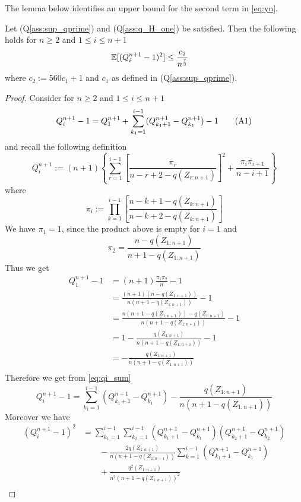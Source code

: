 %
The lemma below identifies an upper bound for the second term in \eqref{eq:yn}.
\begin{lemma} \label{lem:qisquare_upper_bound} 
	Let (Q\ref{ass:sup_qprime})  and (Q\ref{ass:q_H_one}) be satisfied. Then the following holds for $n\geq 2$ and $1\leq i\leq n+1$ 
	\begin{align*}
		\mathbb{E}[(Q_i^{n+1} - 1)^2] &\leq \frac{c_2}{n^\frac{7}{3}}
	\end{align*}
	where $c_2:= 560 c_1 + 1$ and $c_1$ as defined in (Q\ref{ass:sup_qprime}). 
	\begin{proof}
		Consider for $n\geq 2$ and $1\leq i\leq n+1$
		\begin{equation*}
			Q_i^{n+1} - 1 = Q_1^{n+1} + \sum_{k_1=1}^{i-1} (Q_{k_1+1}^{n+1} - Q_{k_1}^{n+1}) - 1 \numberthis \label{eq:qi_sum}
		\end{equation*}
		and recall the following definition
		$$Q_i^{n+1} := (n+1)\left\{\sum_{r=1}^{i-1}\left[\frac{\pi_r}{n-r+2-q(Z_{r:n+1})}\right]^2 + \frac{\pi_i \pi_{i+1}}{n-i+1} \right\}$$
		where
		$$\pi_i := \prod_{k=1}^{i-1} \left[\frac{n-k+1-q(Z_{k:n+1})}{n-k+2-q(Z_{k:n+1})}\right]$$
		We have $\pi_1 = 1$, since the product above is empty for $i=1$ and 
		$$\pi_2 = \frac{n-q(Z_{1:n+1})}{n+1-q(Z_{1:n+1})}$$ 
		Thus we get
		\begin{align*}
			Q_1^{n+1} - 1 &= (n+1)\frac{\pi_1 \pi_2}{n} - 1\\
			&= \frac{(n+1)(n-q(Z_{1:n+1}))}{n(n+1-q(Z_{1:n+1}))} - 1\\
			&= \frac{n(n+1-q(Z_{1:n+1}))-q(Z_{1:n+1})}{n(n+1-q(Z_{1:n+1}))} - 1\\
			&= 1 - \frac{q(Z_{1:n+1})}{n(n+1-q(Z_{1:n+1}))} - 1\\
			&= -\frac{q(Z_{1:n+1})}{n(n+1-q(Z_{1:n+1}))}\\
		\end{align*}
		Therefore we get from \eqref{eq:qi_sum} 
		\begin{equation*}
			Q_i^{n+1} - 1 = \sum_{k_1=1}^{i-1} (Q_{k_1+1}^{n+1} - Q_{k_1}^{n+1}) - \frac{q(Z_{1:n+1})}{n(n+1-q(Z_{1:n+1}))}
		\end{equation*}
		Moreover we have 
		\begin{align*}
			(Q_i^{n+1} - 1)^2 &= \sum_{k_1=1}^{i-1}\sum_{k_2=1}^{i-1}(Q_{k_1+1}^{n+1} - Q_{k_1}^{n+1})(Q_{k_2+1}^{n+1} - Q_{k_2}^{n+1})\\
			&\qquad - \frac{2q(Z_{1:n+1})}{n(n+1-q(Z_{1:n+1}))} \sum_{k=1}^{i-1}(Q_{k_1+1}^{n+1} - Q_{k_1}^{n+1})\\
			&\qquad + \frac{q^2(Z_{1:n+1})}{n^2(n+1-q(Z_{1:n+1}))^2}\\

\end{align*}
\end{proof}
\end{lemma}
